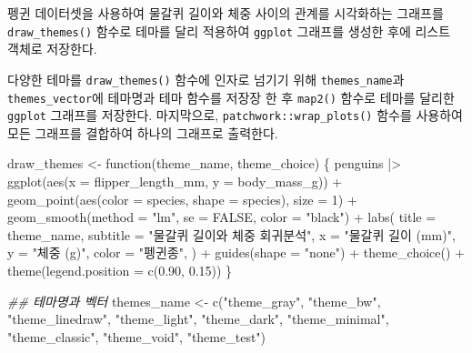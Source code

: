 \documentclass[
  letterpaper,
]{book}
\newenvironment{Shaded}{\begin{snugshade}}{\end{snugshade}}
\newcommand{\AttributeTok}[1]{\textcolor[rgb]{0.40,0.45,0.13}{#1}}
\newcommand{\ConstantTok}[1]{\textcolor[rgb]{0.56,0.35,0.01}{#1}}
\newcommand{\ControlFlowTok}[1]{\textcolor[rgb]{0.00,0.23,0.31}{#1}}
\newcommand{\DecValTok}[1]{\textcolor[rgb]{0.68,0.00,0.00}{#1}}
\newcommand{\DocumentationTok}[1]{\textcolor[rgb]{0.37,0.37,0.37}{\textit{#1}}}
\newcommand{\FloatTok}[1]{\textcolor[rgb]{0.68,0.00,0.00}{#1}}
\newcommand{\FunctionTok}[1]{\textcolor[rgb]{0.28,0.35,0.67}{#1}}
\newcommand{\NormalTok}[1]{\textcolor[rgb]{0.00,0.23,0.31}{#1}}
\newcommand{\OtherTok}[1]{\textcolor[rgb]{0.00,0.23,0.31}{#1}}
\newcommand{\SpecialCharTok}[1]{\textcolor[rgb]{0.37,0.37,0.37}{#1}}
\newcommand{\StringTok}[1]{\textcolor[rgb]{0.13,0.47,0.30}{#1}}
\begin{document}
펭귄 데이터셋을 사용하여 물갈퀴 길이와 체중 사이의 관계를 시각화하는
그래프를 \texttt{draw\_themes()} 함수로 테마를 달리 적용하여
\texttt{ggplot} 그래프를 생성한 후에 리스트 객체로 저장한다.

다양한 테마를 \texttt{draw\_themes()} 함수에 인자로 넘기기 위해
\texttt{themes\_name}과 \texttt{themes\_vector}에 테마명과 테마 함수를
저장장 한 후 \texttt{map2()} 함수로 테마를 달리한 \texttt{ggplot}
그래프를 저장한다. 마지막으로, \texttt{patchwork::wrap\_plots()} 함수를
사용하여 모든 그래프를 결합하여 하나의 그래프로 출력한다.

\begin{Shaded}
\begin{Highlighting}[]
\NormalTok{draw\_themes }\OtherTok{\textless{}{-}} \ControlFlowTok{function}\NormalTok{(theme\_name, theme\_choice) \{}
\NormalTok{  penguins }\SpecialCharTok{|\textgreater{}} 
    \FunctionTok{ggplot}\NormalTok{(}\FunctionTok{aes}\NormalTok{(}\AttributeTok{x =}\NormalTok{ flipper\_length\_mm, }\AttributeTok{y =}\NormalTok{ body\_mass\_g)) }\SpecialCharTok{+}
      \FunctionTok{geom\_point}\NormalTok{(}\FunctionTok{aes}\NormalTok{(}\AttributeTok{color =}\NormalTok{ species, }\AttributeTok{shape =}\NormalTok{ species), }\AttributeTok{size =} \DecValTok{1}\NormalTok{) }\SpecialCharTok{+}
      \FunctionTok{geom\_smooth}\NormalTok{(}\AttributeTok{method =} \StringTok{"lm"}\NormalTok{, }\AttributeTok{se =} \ConstantTok{FALSE}\NormalTok{, }\AttributeTok{color =} \StringTok{"black"}\NormalTok{)  }\SpecialCharTok{+}
      \FunctionTok{labs}\NormalTok{(}
        \AttributeTok{title =}\NormalTok{ theme\_name,}
        \AttributeTok{subtitle =} \StringTok{"물갈퀴 길이와 체중 회귀분석"}\NormalTok{,}
        \AttributeTok{x =} \StringTok{"물갈퀴 길이 (mm)"}\NormalTok{,}
        \AttributeTok{y =} \StringTok{"체중 (g)"}\NormalTok{,}
        \AttributeTok{color =} \StringTok{"펭귄종"}\NormalTok{,}
\NormalTok{      ) }\SpecialCharTok{+}
      \FunctionTok{guides}\NormalTok{(}\AttributeTok{shape =} \StringTok{"none"}\NormalTok{) }\SpecialCharTok{+}
      \FunctionTok{theme\_choice}\NormalTok{() }\SpecialCharTok{+}
      \FunctionTok{theme}\NormalTok{(}\AttributeTok{legend.position =} \FunctionTok{c}\NormalTok{(}\FloatTok{0.90}\NormalTok{, }\FloatTok{0.15}\NormalTok{))    }
\NormalTok{\}}

\DocumentationTok{\#\# 테마명과 벡터}
\NormalTok{themes\_name }\OtherTok{\textless{}{-}} \FunctionTok{c}\NormalTok{(}\StringTok{"theme\_gray"}\NormalTok{, }\StringTok{"theme\_bw"}\NormalTok{, }\StringTok{"theme\_linedraw"}\NormalTok{, }
                 \StringTok{"theme\_light"}\NormalTok{, }\StringTok{"theme\_dark"}\NormalTok{, }\StringTok{"theme\_minimal"}\NormalTok{, }\StringTok{"theme\_classic"}\NormalTok{, }
                 \StringTok{"theme\_void"}\NormalTok{, }\StringTok{"theme\_test"}\NormalTok{)}


\end{Highlighting}
\end{Shaded}
\end{document}
